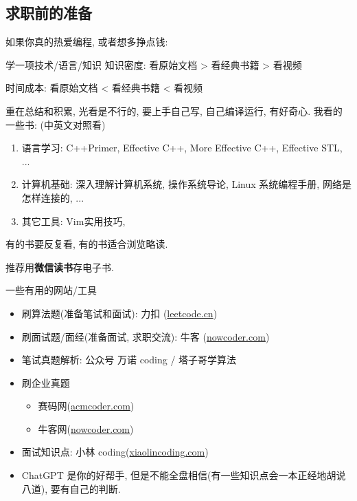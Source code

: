 \documentclass{ctexbeamer}
\begin{document}
\subsection{求职前的准备}
\begin{frame}
	如果你真的热爱编程, 或者想多挣点钱: 
	\begin{alertblock}{学一项技术/语言/知识}
		知识密度: 看原始文档 > 看经典书籍 > 看视频

		时间成本: 看原始文档 < 看经典书籍 < 看视频
	\end{alertblock}
	重在总结和积累, 光看是不行的, 要上手自己写, 自己编译运行, 有好奇心.
	我看的一些书: (中英文对照看)
	\begin{enumerate}
		\item 语言学习: C++Primer, Effective C++, More Effective C++, Effective STL, ...
		\item 计算机基础: 深入理解计算机系统, 操作系统导论, Linux 系统编程手册, 网络是怎样连接的, ...
		\item 其它工具: Vim实用技巧,
	\end{enumerate}
	有的书要反复看, 有的书适合浏览略读.

	推荐用\textbf{微信读书}存电子书.
\end{frame}


\begin{frame}{一些有用的网站/工具}
	\begin{itemize}
		\item 刷算法题(准备笔试和面试): 力扣 (\hyperref[https://leetcode.cn]{leetcode.cn})
		\item 刷面试题/面经(准备面试, 求职交流): 牛客 (\hyperref[https://nowcoder.com]{nowcoder.com})
		\item 笔试真题解析: 公众号 万诺 coding / 塔子哥学算法
		\item 刷企业真题
		      \begin{itemize}
			      \item 赛码网(\hyperref[https://acmcoder.com]{acmcoder.com})
			      \item 牛客网(\hyperref[https://nowcoder.com]{nowcoder.com})
		      \end{itemize}
		\item 面试知识点: 小林 coding(\hyperref[https://xiaolincoding.com]{xiaolincoding.com})
		\item ChatGPT 是你的好帮手, 但是不能全盘相信(有一些知识点会一本正经地胡说八道), 要有自己的判断. 
	\end{itemize}
\end{frame}
\end{document}
